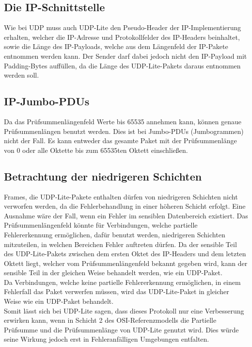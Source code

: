 \documentclass{template}
\begin{document}
\subsection{Die IP-Schnittstelle}

Wie bei UDP muss auch UDP-Lite den Pseudo-Header der 
IP-Implementierung erhalten, welcher die IP-Adresse 
und Protokollfelder des IP-Headers beinhaltet, sowie die
Länge des IP-Payloads, welche aus dem Längenfeld der IP-Pakete
entnommen werden kann.
Der Sender darf dabei jedoch nicht den IP-Payload mit Padding-Bytes
auffüllen, da die Länge des UDP-Lite-Pakets daraus entnommen werden soll.\\


\subsection{IP-Jumbo-PDUs}

Da das Prüfsummenlängenfeld Werte bis 65535 annehmen kann,
können genaue Prüfsummenlängen benutzt werden. Dies ist bei
Jumbo-PDUs (Jumbogrammen) nicht der Fall. Es kann entweder das
gesamte Paket mit der Prüfsummenlänge von 0 oder alle Oktette bis
zum 65535ten Oktett einschließen.\\


\subsection{Betrachtung der niedrigeren Schichten}

Frames, die UDP-Lite-Pakete enthalten dürfen von niedrigeren
Schichten nicht verworfen werden, da die Fehlerbehandlung in einer
höheren Schicht erfolgt. Eine Ausnahme wäre der Fall, wenn ein
Fehler im sensiblen Datenbereich existiert. Das Prüfsummenlängenfeld
könnte für Verbindungen, welche partielle Fehlererkennung ermöglichen, dafür benutzt werden,
niedrigeren Schichten mitzuteilen,
in welchen Bereichen Fehler auftreten dürfen. Da der sensible
Teil des UDP-Lite-Pakets zwischen dem ersten Oktet des IP-Headers
und dem letzten Oktett liegt, welcher vom Prüfsummenlängenfeld
bekannt gegeben wird, kann der sensible Teil in der gleichen Weise
behandelt werden, wie ein UDP-Paket.\\

Da Verbindungen, welche keine partielle Fehlererkennung ermöglichen,
in einem Fehlerfall das Paket verwerfen müssen, wird das UDP-Lite-Paket
in gleicher Weise wie ein UDP-Paket behandelt.\\

Somit lässt sich bei UDP-Lite sagen, dass dieses Protokoll nur eine
Verbesserung erwirken kann, wenn in Schicht 2 des OSI-Referenzmodells
die Partielle Prüfsumme und die Prüfsummenlänge von UDP-Lite genutzt wird.
Dies würde seine Wirkung jedoch erst in Fehleranfälligen
Umgebungen entfalten.\\
\end{document}
